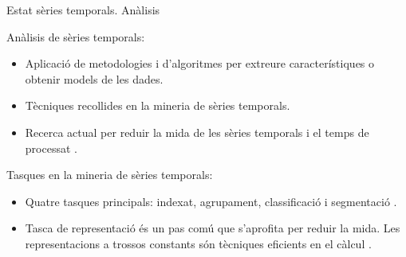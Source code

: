 \begin{frame}{Estat sèries temporals. Anàlisis}

  Anàlisis de sèries temporals:

  \begin{itemize}

  \item Aplicació de metodologies i d'algoritmes per extreure
    característiques o obtenir models de les dades.

  \item Tècniques recollides en la  mineria de sèries temporals.

  \item Recerca actual per reduir la mida de les sèries temporals i el
    temps de processat \parencite{fu11}. 

  \end{itemize}
  

  Tasques en la mineria de sèries temporals:

  \begin{itemize}

  \item Quatre tasques principals: indexat, agrupament, classificació i segmentació \parencite{keogh02}.

  \item Tasca de representació és un pas comú que s'aprofita per
    reduir la mida.  Les representacions a trossos constants són
    tècniques eficients en el càlcul \parencite{keogh00}.

  \end{itemize}

\end{frame}




